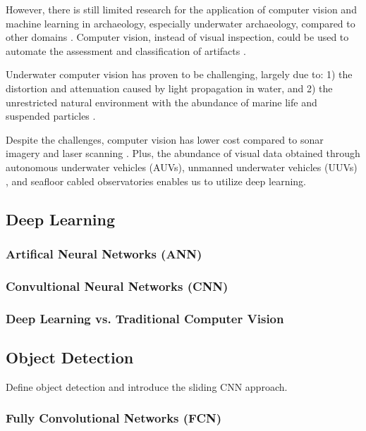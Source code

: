 \documentclass[a4paper,11pt,oneside]{article}
\begin{document}
  However, there is still limited research for the application of computer vision and machine learning in archaeology,
  especially underwater archaeology, compared to other domains \cite{maaten2007computer, qin2015underwater}.
  Computer vision, instead of visual inspection, could be used to automate the assessment and classification of artifacts
  \cite{maaten2007computer}.

  Underwater computer vision has proven to be challenging, largely due to: 1) the distortion and attenuation caused by
  light propagation in water, and 2) the unrestricted natural environment with the abundance of marine life and suspended
  particles \cite{rizzini2015investigation, qin2015underwater, lu2017underwater}.

  Despite the challenges, computer vision has lower cost \cite{rizzini2015investigation} compared to sonar imagery
  \cite{abu2019statistically} and laser scanning \cite{gordon1992use}. Plus, the abundance of visual data obtained through
  autonomous underwater vehicles (AUVs), unmanned underwater vehicles (UUVs) \cite{lu2017underwater}, and seafloor cabled
  observatories \cite{qin2015underwater} enables us to utilize deep learning.


  \subsection{Deep Learning}

  \subsubsection{Artifical Neural Networks (ANN)}
  \subsubsection{Convultional Neural Networks (CNN)}
  \subsubsection{Deep Learning vs. Traditional Computer Vision}

  \subsection{Object Detection}

  Define object detection and introduce the sliding CNN approach.

  \subsubsection{Fully Convolutional Networks (FCN)}
\end{document}

